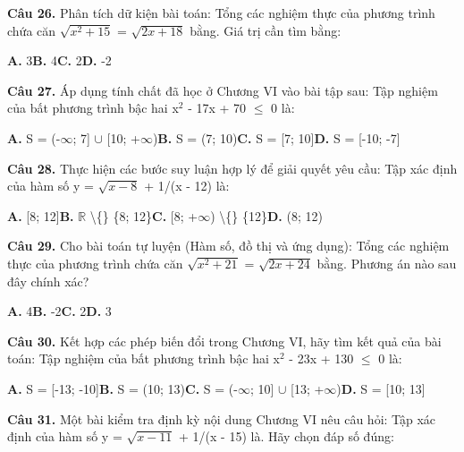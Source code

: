 \documentclass[11pt,a4paper]{article}
\begin{document}
\textbf{\color{primary} Câu 26.} Phân tích dữ kiện bài toán: Tổng các nghiệm thực của phương trình chứa căn $\sqrt{x^2 + 15}$ = $\sqrt{2x + 18}$ bằng. Giá trị cần tìm bằng:\par
\hspace*{1.5em}\textbf{A.} 3\quad\quad \textbf{B.} 4\quad\quad \textbf{C.} 2\quad\quad \textbf{D.} -2\par\vspace{2pt}
\textbf{\color{primary} Câu 27.} Áp dụng tính chất đã học ở Chương VI vào bài tập sau: Tập nghiệm của bất phương trình bậc hai x$^2$ - 17x + 70 $\le$ 0 là:\par
\hspace*{1.5em}\textbf{A.} S = (-$\infty$; 7] $\cup$ [10; +$\infty$)\quad\quad \textbf{B.} S = (7; 10)\quad\quad \textbf{C.} S = [7; 10]\quad\quad \textbf{D.} S = [-10; -7]\par\vspace{2pt}
\textbf{\color{primary} Câu 28.} Thực hiện các bước suy luận hợp lý để giải quyết yêu cầu: Tập xác định của hàm số y = $\sqrt{x - 8}$ + 1/(x - 12) là:\par
\hspace*{1.5em}\textbf{A.} [8; 12]\quad\quad \textbf{B.} $\mathbb{R}$ \textbackslash\{\} \{8; 12\}\quad\quad \textbf{C.} [8; +$\infty$) \textbackslash\{\} \{12\}\quad\quad \textbf{D.} (8; 12)\par\vspace{2pt}
\textbf{\color{primary} Câu 29.} Cho bài toán tự luyện (Hàm số, đồ thị và ứng dụng): Tổng các nghiệm thực của phương trình chứa căn $\sqrt{x^2 + 21}$ = $\sqrt{2x + 24}$ bằng. Phương án nào sau đây chính xác?\par
\hspace*{1.5em}\textbf{A.} 4\quad\quad \textbf{B.} -2\quad\quad \textbf{C.} 2\quad\quad \textbf{D.} 3\par\vspace{2pt}
\textbf{\color{primary} Câu 30.} Kết hợp các phép biến đổi trong Chương VI, hãy tìm kết quả của bài toán: Tập nghiệm của bất phương trình bậc hai x$^2$ - 23x + 130 $\le$ 0 là:\par
\hspace*{1.5em}\textbf{A.} S = [-13; -10]\quad\quad \textbf{B.} S = (10; 13)\quad\quad \textbf{C.} S = (-$\infty$; 10] $\cup$ [13; +$\infty$)\quad\quad \textbf{D.} S = [10; 13]\par\vspace{2pt}
\textbf{\color{primary} Câu 31.} Một bài kiểm tra định kỳ nội dung Chương VI nêu câu hỏi: Tập xác định của hàm số y = $\sqrt{x - 11}$ + 1/(x - 15) là. Hãy chọn đáp số đúng:\par
\end{document}
